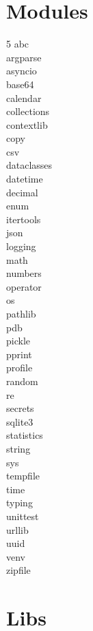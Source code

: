 \documentclass [8pt] {extarticle}
\begin{document}
    \section {Modules}

    \begin {multicols} {5}
    abc \\
    argparse \\
    asyncio \\
    base64 \\
    calendar \\
    collections \\
    contextlib \\
    copy \\
    csv \\
    dataclasses \\
    datetime \\
    decimal \\
    enum \\
    itertools \\
    json \\
    logging \\
    math \\
    numbers \\
    operator \\
    os \\
    pathlib \\
    pdb \\
    pickle \\
    pprint \\
    profile \\
    random \\
    re \\
    secrets \\
    sqlite3 \\
    statistics \\
    string \\
    sys \\
    tempfile \\
    time \\
    typing \\
    unittest \\
    urllib \\
    uuid \\
    venv \\
    zipfile \\
    \end {multicols}

    \section {Libs}
\end{document}
